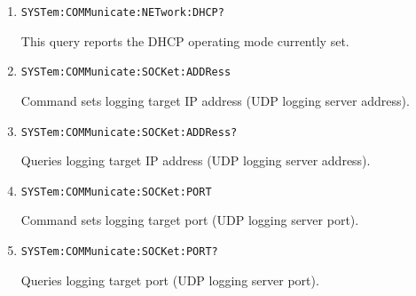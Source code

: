 \documentclass[a4paper,10pt]{article}
\begin{document}
\begin{enumerate}
\begin{enumerate}
\begin{description}
		    \end{description}
		\item 
		    \begin{verbatim}SYSTem:COMMunicate:NETwork:DHCP?\end{verbatim}
		    \begin{description}
		        This query reports the DHCP operating mode currently set.
		    \end{description}
		\item 
		    \begin{verbatim}SYSTem:COMMunicate:SOCKet:ADDRess\end{verbatim}
		    \begin{description}
		        Command sets logging target IP address (UDP logging server address). 
		    \end{description}
		\item 
		    \begin{verbatim}SYSTem:COMMunicate:SOCKet:ADDRess?\end{verbatim}
		    \begin{description}
		        Queries logging target IP address (UDP logging server address).
		    \end{description}
		\item
		    \begin{verbatim}SYSTem:COMMunicate:SOCKet:PORT\end{verbatim}
		    \begin{description}
		        Command sets logging target port (UDP logging server port).
		    \end{description}
		\item 
		    \begin{verbatim}SYSTem:COMMunicate:SOCKet:PORT?\end{verbatim}
		    \begin{description}
		        Queries logging target port (UDP logging server port).
		    \end{description}


\end{enumerate}
\end{enumerate}
\end{document}
